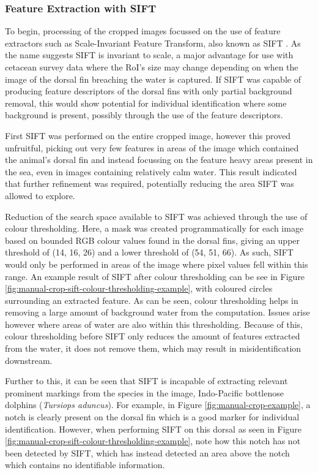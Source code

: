 \subsubsection{Feature Extraction with SIFT}\label{ch:cetDet,sec:deciding,sub:boundingBoxInvestigation,subsub:SIFT}

To begin, processing of the cropped images focussed on the use of feature extractors such as Scale-Invariant Feature Transform, also known as SIFT \cite{lowe_object_1999}. As the name suggests SIFT is invariant to scale, a major advantage for use with cetacean survey data where the RoI's size may change depending on when the image of the dorsal fin breaching the water is captured. If SIFT was capable of producing feature descriptors of the dorsal fins with only partial background removal, this would show potential for individual identification where some background is present, possibly through the use of the feature descriptors.

First SIFT was performed on the entire cropped image, however this proved unfruitful, picking out very few features in areas of the image which contained the animal's dorsal fin and instead focussing on the feature heavy areas present in the sea, even in images containing relatively calm water. This result indicated that further refinement was required, potentially reducing the area SIFT was allowed to explore. 

Reduction of the search space available to SIFT was achieved through the use of colour thresholding. Here, a mask was created programmatically for each image based on bounded RGB colour values found in the dorsal fins, giving an upper threshold of (14, 16, 26) and a lower threshold of (54, 51, 66). As such, SIFT would only be performed in areas of the image where pixel values fell within this range. An example result of SIFT after colour thresholding can be see in Figure \ref{fig:manual-crop-sift-colour-thresholding-example}, with coloured circles surrounding an extracted feature. As can be seen, colour thresholding helps in removing a large amount of background water from the computation. Issues arise however where areas of water are also within this thresholding. Because of this, colour thresholding before SIFT only reduces the amount of features extracted from the water, it does not remove them, which may result in misidentification downstream.

Further to this, it can be seen that SIFT is incapable of extracting relevant prominent markings from the species in the image, Indo-Pacific bottlenose dolphins (\textit{Tursiops aduncus}). For example, in Figure \ref{fig:manual-crop-example}, a notch is clearly present on the dorsal fin which is a good marker for individual identification. However, when performing SIFT on this dorsal as seen in Figure \ref{fig:manual-crop-sift-colour-thresholding-example}, note how this notch has not been detected by SIFT, which has instead detected an area above the notch which contains no identifiable information. 

